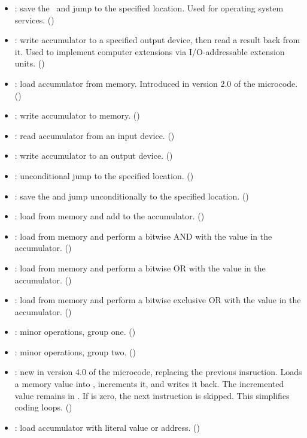 \begin{itemize}
\item {}: save the \PC\ and jump to the specified location. Used
  for operating system services. ()
\item {}: write accumulator to a specified output device, then
  read a result back from it. Used to implement computer extensions via
  I/O-addressable extension units. ()
\item {}: load accumulator from memory. Introduced in version 2.0
  of the microcode. ()
\item {}: write accumulator to memory. ()
\item {}: read accumulator from an input device. ()
\item {}: write accumulator to an output device. ()
\item {}: unconditional jump to the specified location. ()
\item {}: save the \PC{} and jump unconditionally to the specified
  location. ()
\item {}: load from memory and add to the
  accumulator. ()
\item {}: load from memory and perform a bitwise AND with the
  value in the accumulator. ()
\item {}: load from memory and perform a bitwise OR with the value
  in the accumulator. ()
\item {}: load from memory and perform a bitwise exclusive OR with
  the value in the accumulator. ()
\item {}: minor operations, group one. ()
\item {}: minor operations, group two. ()
\item {}: new in version 4.0 of the microcode, replacing the
  previous  insruction. Loads a memory value into \A, increments it,
  and writes it back. The incremented value remains in \A{}. If \A{} is zero,
  the next instruction is skipped. This simplifies coding
  loops. ()
\item {}: load accumulator with literal value or
  address. ()
\end{itemize}

